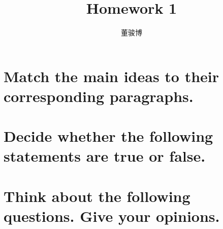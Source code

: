 \documentclass[onecolumn,oneside]{SUSTechHomework}
\author{董骏博}
\title{Homework 1}
\begin{document}
  \maketitle

  \section{Match the main ideas to their corresponding paragraphs.}

  \section{Decide whether the following statements are true or false.}

  \section{Think about the following questions. Give your opinions.}
\end{document}
